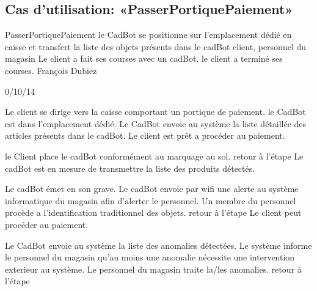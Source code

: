 ﻿%
\subsection{Cas d'utilisation: «PasserPortiquePaiement» }

\startCU
\nom PasserPortiquePaiement
\but le CadBot se positionne sur l'emplacement dédié en caisse et transfert la liste des objets présents dans le cadBot
\acteur client, personnel du magasin
\precondition Le client a fait ses courses avec un cadBot.
\declenchement le client a terminé ses courses.
\auteur François Dubiez
\date 30/10/14

\nominal %
\startnominal
\etape[PPP:SA1] Le client se dirige vers la caisse comportant un portique de paiement.
 le CadBot est dans l'emplacement dédié.
\etape[PPP:SA2] Le CadBot envoie au système la liste détaillée des articles présents dans le cadBot.
\stopnominal
\postcondition Le client est prêt a procéder au paiement.

\alternatifs %
\startalternatif[PPP:SA1] %
\startcondition[ModeManuel] 
  \etape le Client place le cadBot conformément au marquage au sol.
  \etape retour à l'étape 
\stopcondition
\postcondition Le cadBot est en mesure de transmettre la liste des produits détectés.
\stopalternatif

  \etape Le cadBot émet en son grave.
  \etape Le cadBot envoie par wifi une alerte au système informatique du magasin afin d'alerter le personnel.
 \etape Un membre du personnel procède a l'identification traditionnel des objets. 
  \etape retour à l'étape 
\stopcondition
\postcondition Le client peut procéder au paiement.
\stopalternatif

\startalternatif[PPP:SA2]
\startcondition[Anomalies]
  \etape Le CadBot envoie au système la liste des anomalies détectées.
    \etape Le système informe le personnel du magasin qu'au moins une anomalie nécessite une intervention exterieur au système.
  \etape Le personnel du magasin traite la/les anomalies.
  \etape retour à l'étape 
\stopcondition
\stopalternatif

\stopCU
